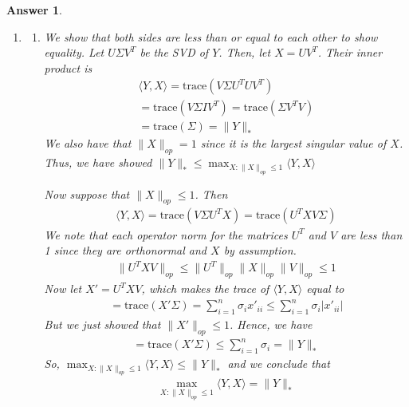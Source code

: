 \documentclass[12pt]{article}
\theoremstyle{colon}
\newtheorem*{answer}{Answer}
\begin{document}
\begin{answer}
\begin{enumerate}[label=\arabic*)]
    \item
      \begin{enumerate}[label=\alph*)]
        \item We show that both sides are less than or equal to each other to show equality. Let $U \Sigma V^T$ be the SVD of $Y$. Then, let $X = U V^T$. Their inner product is
          \begin{gather*}
            \langle Y, X \rangle = \text{trace}(V \Sigma U^T U V^T) \\
            = \text{trace}(V \Sigma I V^T) = \text{trace}(\Sigma V^T V) \\
            = \text{trace}(\Sigma) = \lVert Y \rVert_*
          \end{gather*}
          We also have that $\lVert X \rVert_{op} = 1$ since it is the largest singular value of $X$. Thus, we have showed $\lVert Y \rVert_* \leq \max_{X : \lVert X \rVert_{op} \leq 1} \langle Y, X \rangle$

          Now suppose that $\lVert X \rVert_{op} \leq 1$. Then
          \begin{gather*}
            \langle Y, X \rangle = \text{trace}(V \Sigma U^T X) = \text{trace}(U^T X V \Sigma)
          \end{gather*}
          We note that each operator norm for the matrices $U^T$ and $V$ are less than 1 since they are orthonormal and $X$ by assumption.
          \begin{gather*}
            \lVert U^T X V \rVert_{op} \leq \lVert U^T \rVert_{op} \lVert X \rVert_{op} \lVert V \rVert_{op} \leq 1
          \end{gather*}
          Now let $X' = U^T X V$, which makes the trace of $\langle Y, X \rangle$ equal to
          \begin{gather*}
            = \text{trace}(X' \Sigma) = \sum_{i=1}^n \sigma_i x'_{ii} \leq \sum_{i=1}^n \sigma_i \lvert x'_{ii} \rvert
          \end{gather*}
          But we just showed that $\lVert X' \rVert_{op} \leq 1$. Hence, we have
          \begin{gather*}
            = \text{trace}(X' \Sigma) \leq \sum_{i=1}^n \sigma_i = \lVert Y \rVert_*
          \end{gather*}
          So, $\max_{X : \lVert X \rVert_{op} \leq 1} \langle Y, X \rangle \leq \lVert Y \rVert_*$ and we conclude that
          \begin{gather*}
            \max_{X : \lVert X \rVert_{op} \leq 1} \langle Y, X \rangle = \lVert Y \rVert_*
          \end{gather*}


\end{enumerate}
\end{enumerate}
\end{answer}
\end{document}
